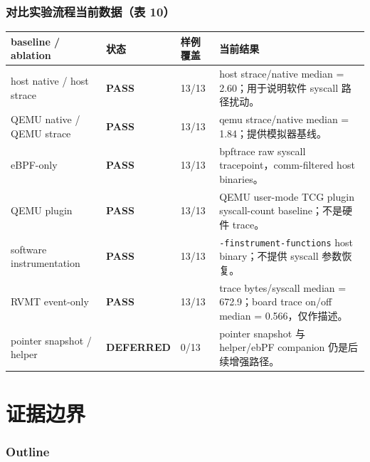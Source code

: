 \documentclass[aspectratio=169,10pt]{beamer}
\newcommand{\tagok}[1]{\textcolor{rvgreen}{\textbf{#1}}}
\newcommand{\tagwarn}[1]{\textcolor{rvorange}{\textbf{#1}}}
\begin{document}
\begin{frame}
  \frametitle{对比实验流程当前数据（表 10）}
  \vskip0.05cm
  \begin{center}\scriptsize
  \renewcommand{\arraystretch}{1.13}
  \begin{tabularx}{0.97\linewidth}{@{}L{2.9cm}L{1.35cm}L{2.6cm}Y@{}}
    \toprule
    \textbf{baseline / ablation} & \textbf{状态} & \textbf{样例覆盖} & \textbf{当前结果} \\
    \midrule
    host native / host strace & \tagok{PASS} & 13/13 & host strace/native median = 2.60；用于说明软件 syscall 路径扰动。 \\
    QEMU native / QEMU strace & \tagok{PASS} & 13/13 & qemu strace/native median = 1.84；提供模拟器基线。 \\
    eBPF-only & \tagok{PASS} & 13/13 & bpftrace raw syscall tracepoint，comm-filtered host binaries。 \\
    QEMU plugin & \tagok{PASS} & 13/13 & QEMU user-mode TCG plugin syscall-count baseline；不是硬件 trace。 \\
    software instrumentation & \tagok{PASS} & 13/13 & \texttt{-finstrument-functions} host binary；不提供 syscall 参数恢复。 \\
    RVMT event-only & \tagok{PASS} & 13/13 & trace bytes/syscall median = 672.9；board trace on/off median = 0.566，仅作描述。 \\
    pointer snapshot / helper & \tagwarn{DEFERRED} & 0/13 & pointer snapshot 与 helper/ebPF companion 仍是后续增强路径。 \\
    \bottomrule
  \end{tabularx}
  \end{center}
\end{frame}

\section{证据边界}

\begin{frame}
  \frametitle{Outline}
  \vskip0.4cm
  \tableofcontents[currentsection]
\end{frame}
\end{document}

